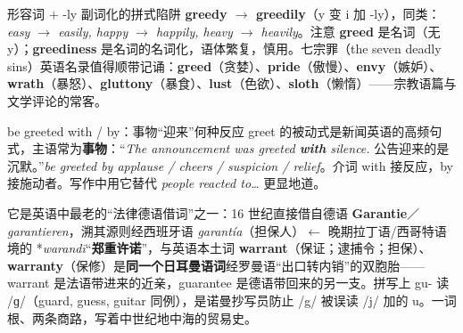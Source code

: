 \documentclass[../main.tex]{subfiles}
\begin{document}


\begin{gram}{形容词 $+$ -ly 副词化的拼式陷阱}
\textbf{greedy $\to$ greedily}（y 变 i 加 -ly），同类：\textit{easy $\to$ easily, happy $\to$ happily, heavy $\to$ heavily}。注意 \textbf{greed} 是名词（无 y）；\textbf{greediness} 是名词的名词化，语体繁复，慎用。七宗罪（the seven deadly sins）英语名录值得顺带记诵：\textbf{greed}（贪婪）、\textbf{pride}（傲慢）、\textbf{envy}（嫉妒）、\textbf{wrath}（暴怒）、\textbf{gluttony}（暴食）、\textbf{lust}（色欲）、\textbf{sloth}（懒惰）——宗教语篇与文学评论的常客。
\end{gram}



\begin{gram}{be greeted with / by：事物“迎来”何种反应}
greet 的被动式是新闻英语的高频句式，主语常为\textbf{事物}：“\textit{The announcement was greeted \textbf{with} silence.} 公告迎来的是沉默。”\textit{be greeted by applause / cheers / suspicion / relief}。介词 with 接反应，by 接施动者。写作中用它替代 \textit{people reacted to\dots} 更显地道。
\end{gram}




\begin{origin}
它是英语中最老的“法律德语借词”之一：16 世纪直接借自德语 \textbf{Garantie}／\textit{garantieren}，溯其源则经西班牙语 \textit{garantía}（担保人）$\leftarrow$ 晚期拉丁语/西哥特语境的 *\textit{warandī}“\textbf{郑重许诺}”，与英语本土词 \textbf{warrant}（保证；逮捕令；担保）、\textbf{warranty}（保修）是\textbf{同一个日耳曼语词}经罗曼语“出口转内销”的双胞胎——warrant 是法语带进来的近亲，guarantee 是德语带回来的另一支。拼写上 gu- 读 /ɡ/（guard, guess, guitar 同例），是诺曼抄写员防止 /g/ 被误读 /j/ 加的 u。一词根、两条商路，写着中世纪地中海的贸易史。
\end{origin}
\end{document}
